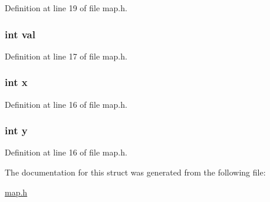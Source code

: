 Definition at line 19 of file map.\-h.

\hypertarget{structpt__t_aa0ccb5ee6d882ee3605ff47745c6467b}{
\subsubsection[{val}]{\setlength{\rightskip}{0pt plus 5cm}int val}}\label{structpt__t_aa0ccb5ee6d882ee3605ff47745c6467b}


Definition at line 17 of file map.\-h.

\hypertarget{structpt__t_a6150e0515f7202e2fb518f7206ed97dc}{
\subsubsection[{x}]{\setlength{\rightskip}{0pt plus 5cm}int x}}\label{structpt__t_a6150e0515f7202e2fb518f7206ed97dc}


Definition at line 16 of file map.\-h.

\hypertarget{structpt__t_a0a2f84ed7838f07779ae24c5a9086d33}{
\subsubsection[{y}]{\setlength{\rightskip}{0pt plus 5cm}int y}}\label{structpt__t_a0a2f84ed7838f07779ae24c5a9086d33}


Definition at line 16 of file map.\-h.



The documentation for this struct was generated from the following file\-:\begin{DoxyCompactItemize}
\item 
\hyperlink{map_8h}{map.\-h}\end{DoxyCompactItemize}
